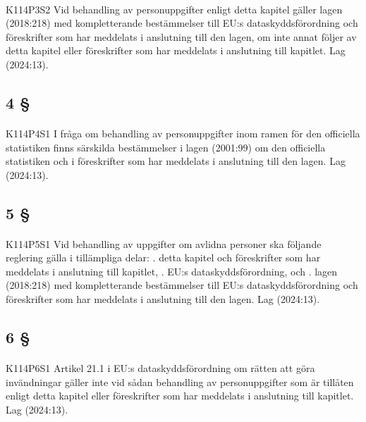 \documentclass[a4paper,notitlepage,openany,10pt]{book}
\begin{document}
\paragraph*{}
{\tiny K114P3S2}
Vid behandling av personuppgifter enligt detta kapitel gäller lagen (2018:218) med kompletterande bestämmelser till EU:s dataskyddsförordning och föreskrifter som har meddelats i anslutning till den lagen, om inte annat följer av detta kapitel eller föreskrifter som har meddelats i anslutning till kapitlet.
Lag (2024:13).
\subsection*{4 §}
\paragraph*{}
{\tiny K114P4S1}
I fråga om behandling av personuppgifter inom ramen för den officiella statistiken finns särskilda bestämmelser i lagen (2001:99) om den officiella statistiken och i föreskrifter som har meddelats i anslutning till den lagen.
Lag (2024:13).
\subsection*{5 §}
\paragraph*{}
{\tiny K114P5S1}
Vid behandling av uppgifter om avlidna personer ska följande reglering gälla i tillämpliga delar:
. detta kapitel och föreskrifter som har meddelats i anslutning till kapitlet,
. EU:s dataskyddsförordning, och
. lagen (2018:218) med kompletterande bestämmelser till EU:s dataskyddsförordning och föreskrifter som har meddelats i anslutning till den lagen.
Lag (2024:13).
\subsection*{6 §}
\paragraph*{}
{\tiny K114P6S1}
Artikel 21.1 i EU:s dataskyddsförordning om rätten att göra invändningar gäller inte vid sådan behandling av personuppgifter som är tillåten enligt detta kapitel eller föreskrifter som har meddelats i anslutning till kapitlet.
Lag (2024:13).
\end{document}
